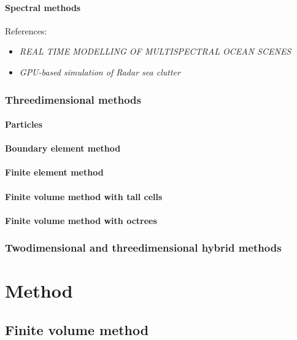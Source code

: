 \documentclass[a4paper]{report}
\begin{document}
\subsection{Spectral methods}

References:
\begin{itemize}
    \item \textit{REAL TIME MODELLING OF MULTISPECTRAL OCEAN SCENES}
    \item \textit{GPU-based simulation of Radar sea clutter}
\end{itemize}

\section{Threedimensional methods}

\subsection{Particles}

\subsection{Boundary element method}

\subsection{Finite element method}

\subsection{Finite volume method with tall cells}

\subsection{Finite volume method with octrees}

\section{Twodimensional and threedimensional hybrid methods}


\part{Method}

\chapter{Finite volume method}
\end{document}
